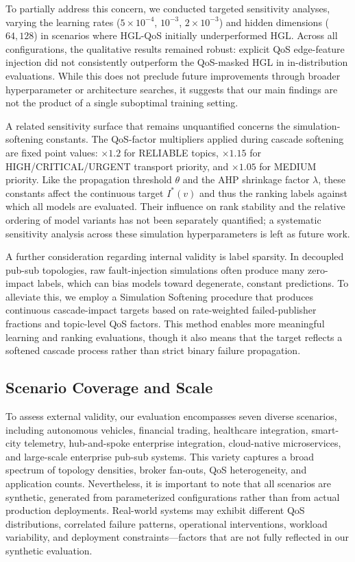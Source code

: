 \documentclass[review]{elsarticle}
\begin{document}
To partially address this concern, we conducted targeted sensitivity analyses, varying the learning
rates ($5\times10^{-4}$, $10^{-3}$, $2\times10^{-3}$) and hidden dimensions ($64, 128$) in
scenarios where HGL-QoS initially underperformed HGL. Across all configurations, the qualitative
results remained robust: explicit QoS edge-feature injection did not consistently outperform the
QoS-masked HGL in in-distribution evaluations. While this does not preclude future improvements
through broader hyperparameter or architecture searches, it suggests that our main findings are not
the product of a single suboptimal training setting.

A related sensitivity surface that remains unquantified concerns the simulation-softening
constants. The QoS-factor multipliers applied during cascade softening are fixed point values:
$\times1.2$ for RELIABLE topics, $\times1.15$ for HIGH/CRITICAL/URGENT transport priority, and
$\times1.05$ for MEDIUM priority. Like the propagation threshold $\theta$ and the AHP shrinkage
factor $\lambda$, these constants affect the continuous target $I^*(v)$ and thus the ranking labels
against which all models are evaluated. Their influence on rank stability and the relative ordering
of model variants has not been separately quantified; a systematic sensitivity analysis across
these simulation hyperparameters is left as future work.

A further consideration regarding internal validity is label sparsity. In decoupled pub-sub
topologies, raw fault-injection simulations often produce many zero-impact labels, which can bias
models toward degenerate, constant predictions. To alleviate this, we employ a Simulation Softening
procedure that produces continuous cascade-impact targets based on rate-weighted failed-publisher
fractions and topic-level QoS factors. This method enables more meaningful learning and ranking
evaluations, though it also means that the target reflects a softened cascade process rather than
strict binary failure propagation.

\subsection{Scenario Coverage and Scale}

To assess external validity, our evaluation encompasses seven diverse scenarios, including
autonomous vehicles, financial trading, healthcare integration, smart-city telemetry,
hub-and-spoke enterprise integration, cloud-native microservices, and large-scale enterprise
pub-sub systems. This variety captures a broad spectrum of topology densities, broker fan-outs,
QoS heterogeneity, and application counts. Nevertheless, it is important to note that all scenarios
are synthetic, generated from parameterized configurations rather than from actual production
deployments. Real-world systems may exhibit different QoS distributions, correlated failure
patterns, operational interventions, workload variability, and deployment constraints---factors
that are not fully reflected in our synthetic evaluation.
\end{document}

